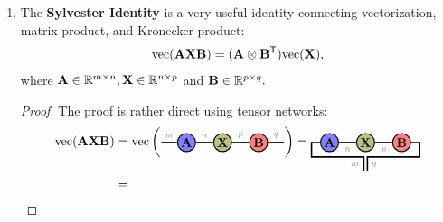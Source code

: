 \begin{remark}
\begin{enumerate}
\item The \textbf{Sylvester Identity} is a very useful identity connecting vectorization, matrix product, and Kronecker product: $$\mathrm{vec}(\mathbf{A}\mathbf{X}\mathbf{B}) = (\mathbf{A}\otimes \mathbf{B}^{\mathsf{T}})\mathrm{vec}(\mathbf{X}),$$
where $\mathbf{A}\in\mathbb{R}^{m\times n},\mathbf{X}\in\mathbb{R}^{n\times p}$ and $\mathbf{B}\in\mathbb{R}^{p\times q}.$
\begin{proof}
The proof is rather direct using tensor networks: 
\begin{align*}
\vectorize(\Ab\Xb\Bb) &=
 \vectorize\left(\begin{tikzpicture}[baseline=-0.5ex]
    \tikzset{tensor/.style = {minimum size = 0.5cm,shape = circle,thick,draw=black,inner sep = 0pt}, edge/.style = {thick,line width=.4mm},every loop/.style={}}
    \def\x{6}
    \node[tensor,fill=blue!50!white] (A) at (\x-1,0) {$\Ab$};
    \node[tensor,fill=green!50!red!50!white] (X) at (\x,0) {$\Xb$};
    \node[tensor,fill=red!50!white] (B) at (\x+1,0) {$\Bb$};
    \draw[edge] (A) -- (X) node [midway,above] {\scalebox{0.7}{\dimcolor{$n$}}};
    \draw[edge] (X) -- (B) node [midway,above] {\scalebox{0.7}{\dimcolor{$p$}}};
    \draw[edge] (A) -- (\x-1.7,0) node [midway,above] {\scalebox{0.7}{\dimcolor{$m$}}};
    \draw[edge] (B) -- (\x+1.7,0) node [midway,above] {\scalebox{0.7}{\dimcolor{$q$}}};
    \end{tikzpicture}\right)
=
\begin{tikzpicture}[baseline=-0.5ex]
    \tikzset{tensor/.style = {minimum size = 0.5cm,shape = circle,thick,draw=black,inner sep = 0pt}, edge/.style = {thick,line width=.4mm},every loop/.style={}}
    \def\x{6}
    \node[tensor,fill=blue!50!white] (A) at (\x-1,0) {$\Ab$};
    \node[tensor,fill=green!50!red!50!white] (X) at (\x,0) {$\Xb$};
    \node[tensor,fill=red!50!white] (B) at (\x+1,0) {$\Bb$};
    \draw[edge] (A) -- (X) node [midway,below] {\scalebox{0.7}{\dimcolor{$n$}}};
    \draw[edge] (X) -- (B) node [midway,below] {\scalebox{0.7}{\dimcolor{$p$}}};
    \draw[edge] (A) -- (\x-1.5,0) -- (\x-1.5,-0.4) -- (\x-0.05,-0.4)--(\x-0.05,-0.8) node [midway,left] {\scalebox{0.7}{\dimcolor{$m$}}};
    \draw[edge] (B) -- (\x+1.5,0) -- (\x+1.5,-0.4) -- (\x+0.05,-0.4)--(\x+0.05,-0.8) node [midway,right] {\scalebox{0.7}{\dimcolor{$q$}}};
\end{tikzpicture}\\
&=
\begin{tikzpicture}[baseline=-2ex]
    \tikzset{tensor/.style = {minimum size = 0.5cm,shape = circle,thick,draw=black,inner sep = 0pt}, edge/.style = {thick,line width=.4mm},every loop/.style={}}
    \def\x{6}

\end{tikzpicture}
\end{align*}
\end{proof}
\end{enumerate}
\end{remark}
